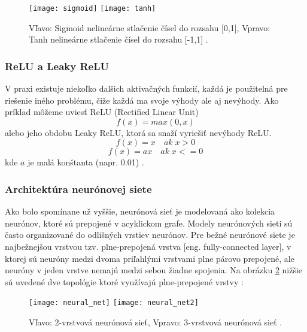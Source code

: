 \begin{figure}[H]
    \centering
    \texttt{[image: sigmoid]}
    \qquad
    \texttt{[image: tanh]}
    \caption{
        Vľavo: Sigmoid nelineárne stlačenie čísel do rozsahu [0,1],
        Vpravo: Tanh nelineárne stlačenie čísel do rozsahu [-1,1] \cite{odkaz:ConvolutionalNeuralNetworkCS231n}.
    }
    \label{pic:ActivationFunctions}
\end{figure}

\subsubsection{ReLU a Leaky ReLU}
V praxi existuje niekoľko dalšich aktivačných funkcií, každá je použitelná pre riešenie iného problému,
    čiže každá ma svoje výhody ale aj nevýhody.
Ako príklad môžeme uviesť ReLU (Rectified Linear Unit)
\begin{equation}
    f(x) = max(0,x)
\end{equation}
alebo jeho obdobu Leaky ReLU, ktorá sa snaží vyriešiť nevýhody ReLU.
\begin{equation}
    f(x) = x \quad ak \; x > 0
\end{equation}
\begin{equation}
    f(x) = ax \quad ak \; x <= 0
\end{equation}
kde $a$ je malá konštanta (napr. 0.01) \cite{odkaz:ConvolutionalNeuralNetworkCS231n}.

\subsubsection{Architektúra neurónovej siete}
Ako bolo spomínane už vyššie, neurónová sieť je modelovaná ako kolekcia neurónov, ktoré sú prepojené v acyklickom grafe.
Modely neurónových sieti sú často organizované do odlišných vrstiev neurónov.
Pre bežné neurónové siete je najbežnejšou vrstvou tzv. plne-prepojená vrstva [eng. fully-connected layer],
    v ktorej sú neuróny medzi dvoma priľahlými vrstvami plne párovo prepojené, ale neuróny v jeden vrstve nemajú medzi sebou žiadne spojenia.
Na obrázku \ref{pic:NeuralNetworkArchitecture} nižšie sú uvedené dve topológie ktoré využívajú plne-prepojené vrstvy \cite{odkaz:ConvolutionalNeuralNetworkCS231n}:
\begin{figure}[H]
    \centering
    \texttt{[image: neural\_net]}
    \qquad
    \texttt{[image: neural\_net2]}
    \caption{Vľavo: 2-vrstvová neurónová sieť, Vpravo: 3-vrstvová neurónová sieť \cite{odkaz:ConvolutionalNeuralNetworkCS231n}.}
    \label{pic:NeuralNetworkArchitecture}
\end{figure}

